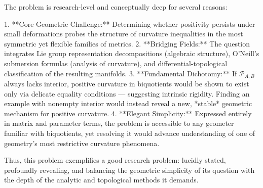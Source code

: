 The problem is research-level and conceptually deep for several reasons:

1. **Core Geometric Challenge:** Determining whether positivity persists under small deformations probes the structure of curvature inequalities in the most symmetric yet flexible families of metrics.  
2. **Bridging Fields:** The question integrates Lie group representation decompositions (algebraic structure), O’Neill’s submersion formulas (analysis of curvature), and differential-topological classification of the resulting manifolds.  
3. **Fundamental Dichotomy:** If \(\mathcal{P}_{A,B}\) always lacks interior, positive curvature in biquotients would be shown to exist only via delicate equality conditions — suggesting intrinsic rigidity. Finding an example with nonempty interior would instead reveal a new, *stable* geometric mechanism for positive curvature.  
4. **Elegant Simplicity:** Expressed entirely in matrix and parameter terms, the problem is accessible to any geometer familiar with biquotients, yet resolving it would advance understanding of one of geometry’s most restrictive curvature phenomena.

Thus, this problem exemplifies a good research problem: lucidly stated, profoundly revealing, and balancing the geometric simplicity of its question with the depth of the analytic and topological methods it demands.